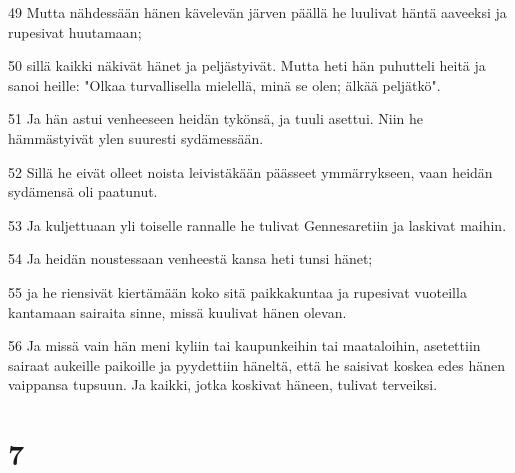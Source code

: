 \par 49 Mutta nähdessään hänen kävelevän järven päällä he luulivat häntä aaveeksi ja rupesivat huutamaan;
\par 50 sillä kaikki näkivät hänet ja peljästyivät. Mutta heti hän puhutteli heitä ja sanoi heille: "Olkaa turvallisella mielellä, minä se olen; älkää peljätkö".
\par 51 Ja hän astui venheeseen heidän tykönsä, ja tuuli asettui. Niin he hämmästyivät ylen suuresti sydämessään.
\par 52 Sillä he eivät olleet noista leivistäkään päässeet ymmärrykseen, vaan heidän sydämensä oli paatunut.
\par 53 Ja kuljettuaan yli toiselle rannalle he tulivat Gennesaretiin ja laskivat maihin.
\par 54 Ja heidän noustessaan venheestä kansa heti tunsi hänet;
\par 55 ja he riensivät kiertämään koko sitä paikkakuntaa ja rupesivat vuoteilla kantamaan sairaita sinne, missä kuulivat hänen olevan.
\par 56 Ja missä vain hän meni kyliin tai kaupunkeihin tai maataloihin, asetettiin sairaat aukeille paikoille ja pyydettiin häneltä, että he saisivat koskea edes hänen vaippansa tupsuun. Ja kaikki, jotka koskivat häneen, tulivat terveiksi.

\chapter{7}

